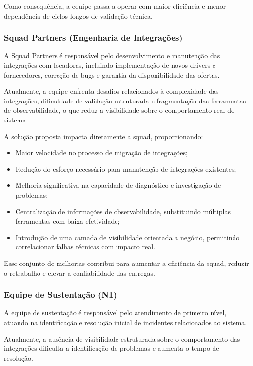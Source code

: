 Como consequência, a equipe passa a operar com maior eficiência e menor dependência de ciclos longos de validação técnica.

\subsubsection{Squad Partners (Engenharia de Integrações)}

A Squad Partners é responsável pelo desenvolvimento e manutenção das integrações com locadoras, incluindo implementação de novos drivers e fornecedores, correção de bugs e garantia da disponibilidade das ofertas.

Atualmente, a equipe enfrenta desafios relacionados à complexidade das integrações, dificuldade de validação estruturada e fragmentação das ferramentas de observabilidade, o que reduz a visibilidade sobre o comportamento real do sistema.

A solução proposta impacta diretamente a squad, proporcionando:

\begin{itemize}
    \item Maior velocidade no processo de migração de integrações;
    \item Redução do esforço necessário para manutenção de integrações existentes;
    \item Melhoria significativa na capacidade de diagnóstico e investigação de problemas;
    \item Centralização de informações de observabilidade, substituindo múltiplas ferramentas com baixa efetividade;
    \item Introdução de uma camada de visibilidade orientada a negócio, permitindo correlacionar falhas técnicas com impacto real.
\end{itemize}

Esse conjunto de melhorias contribui para aumentar a eficiência da squad, reduzir o retrabalho e elevar a confiabilidade das entregas.

\subsubsection{Equipe de Sustentação (N1)}

A equipe de sustentação é responsável pelo atendimento de primeiro nível, atuando na identificação e resolução inicial de incidentes relacionados ao sistema.

Atualmente, a ausência de visibilidade estruturada sobre o comportamento das integrações dificulta a identificação de problemas e aumenta o tempo de resolução.

